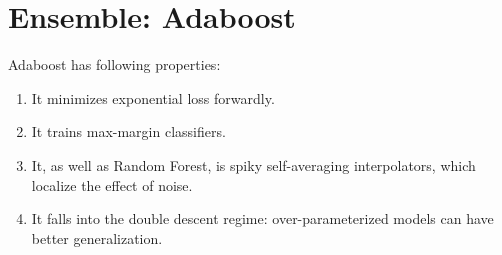 \section{Ensemble: Adaboost}

Adaboost has following properties:
\begin{enumerate}
    \item It minimizes exponential loss forwardly.
    \item It trains max-margin classifiers.
    \item It, as well as Random Forest, is spiky self-averaging interpolators, which localize the effect of noise.
    \item It falls into the double descent regime: over-parameterized models can have better generalization.
\end{enumerate}